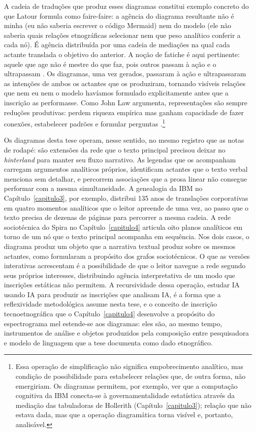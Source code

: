 A cadeia de traduções que produz esses diagramas constitui exemplo concreto do que Latour formula como faire-faire: a agência do diagrama resultante não é minha (eu não saberia escrever o código Mermaid) nem do modelo (ele não saberia quais relações etnográficas selecionar nem que peso analítico conferir a cada nó). É agência distribuída por uma cadeia de mediações na qual cada actante translada o objetivo do anterior. A noção de fatiche é aqui pertinente: aquele que age não é mestre do que faz, pois outros passam à ação e o ultrapassam \parencite{latour2010factish}. Os diagramas, uma vez gerados, passaram à ação e ultrapassaram as intenções de ambos os actantes que os produziram, tornando visíveis relações que nem eu nem o modelo havíamos formulado explicitamente antes que a inscrição as performasse. Como John Law argumenta, representações são sempre reduções produtivas: perdem riqueza empírica mas ganham capacidade de fazer conexões, estabelecer padrões e formular perguntas \parencite{Law2004After}.\footnote{Essa operação de simplificação não significa empobrecimento analítico, mas condição de possibilidade para estabelecer relações que, de outra forma, não emergiriam. Os diagramas permitem, por exemplo, ver que a computação cognitiva da IBM conecta-se à governamentalidade estatística através da mediação das tabuladoras de Hollerith (Capítulo~\ref{capitulo3}); relação que não estava dada, mas que a operação diagramática torna visível e, portanto, analisável.}

Os diagramas desta tese operam, nesse sentido, no mesmo registro que as notas de rodapé: são extensões da rede que o texto principal precisou deixar no \textit{hinterland} para manter seu fluxo narrativo. As legendas que os acompanham carregam argumentos analíticos próprios, identificam actantes que o texto verbal menciona sem detalhar, e percorrem associações que a prosa linear não consegue performar com a mesma simultaneidade. A genealogia da IBM no Capítulo~\ref{capitulo3}, por exemplo, distribui 135 anos de translações corporativas em quatro momentos analíticos que o leitor apreende de uma vez, ao passo que o texto precisa de dezenas de páginas para percorrer a mesma cadeia. A rede sociotécnica do Spira no Capítulo~\ref{capitulo4} articula oito planos analíticos em torno de um nó que o texto principal acompanha em sequência. Nos dois casos, o diagrama produz um objeto que a narrativa textual produz sobre os mesmos actantes, como \textcite{LatourMauguinTeil1992} formularam a propósito dos grafos sociotécnicos. O que as versões interativas acrescentam é a possibilidade de que o leitor navegue a rede segundo seus próprios interesses, distribuindo agência interpretativa de um modo que inscrições estáticas não permitem. A recursividade dessa operação, estudar IA usando IA para produzir as inscrições que analisam IA, é a forma que a reflexividade metodológica assume nesta tese, e o conceito de inscrição tecnoetnográfica que o Capítulo~\ref{capitulo4} desenvolve a propósito do espectrograma mel estende-se aos diagramas: eles são, ao mesmo tempo, instrumentos de análise e objetos produzidos pela composição entre pesquisadora e modelo de linguagem que a tese documenta como dado etnográfico.

